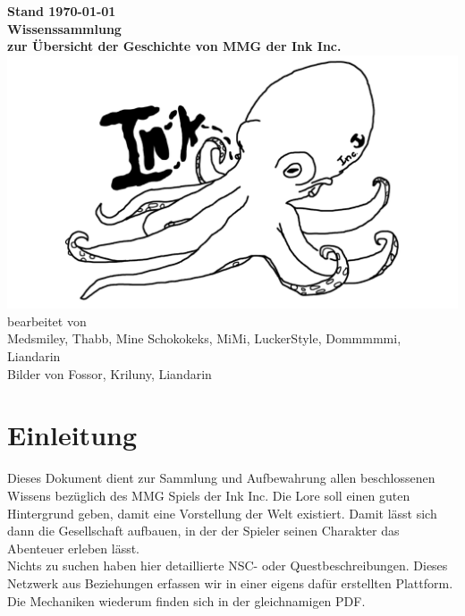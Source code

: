 \documentclass[a4paper,12pt,%
headsepline,%
numbers=noenddot,%
]{scrreprt}
\begin{document}
\begin{titlepage}
	\centering
	\vfill
	\Large{\textbf{Stand {\today}}} \\ \bigskip
	\vfill
	\textsf{\textbf{\Huge{Wissenssammlung}}} \\ \bigskip
	\Large{\textbf{zur Übersicht der Geschichte von MMG der Ink Inc.}} \\ \bigskip
	\vfill
	\includegraphics[width=\linewidth]{Abbildungen/logo.png} \\ \bigskip
	\vfill
	\large
	bearbeitet von\\
	Medsmiley, Thabb, Mine Schokokeks, MiMi, LuckerStyle, Dommmmmi, Liandarin \\ \bigskip
	Bilder von Fossor, Kriluny, Liandarin
\end{titlepage}

\tableofcontents
\listoffigures



\chapter*{Einleitung}
Dieses Dokument dient zur Sammlung und Aufbewahrung allen beschlossenen Wissens bezüglich des MMG Spiels der Ink Inc. 
Die Lore soll einen guten Hintergrund geben, damit eine Vorstellung der Welt existiert. 
Damit lässt sich dann die Gesellschaft aufbauen, in der der Spieler seinen Charakter das Abenteuer erleben lässt. \\

Nichts zu suchen haben hier detaillierte NSC- oder Questbeschreibungen. 
Dieses Netzwerk aus Beziehungen erfassen wir in einer eigens dafür erstellten Plattform. 
Die Mechaniken wiederum finden sich in der gleichnamigen PDF.
\end{document}
